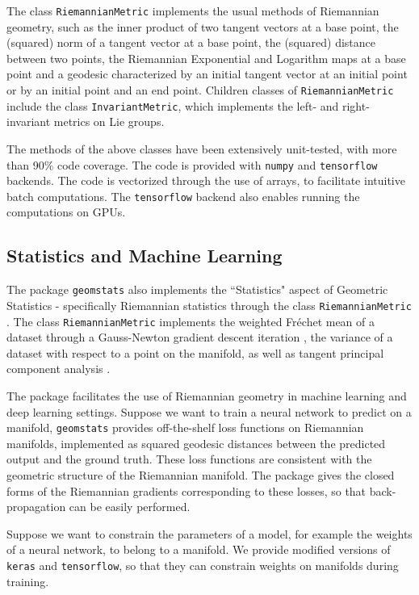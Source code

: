 \documentclass{article}
\begin{document}
The class \texttt{RiemannianMetric} implements the usual methods of Riemannian geometry, such as the inner product of two tangent vectors at a base point, the (squared) norm of a tangent vector at a base point, the (squared) distance between two points, the Riemannian Exponential and Logarithm maps at a base point and a geodesic characterized by an initial tangent vector at an initial point or by an initial point and an end point. Children classes of \texttt{RiemannianMetric} include the class \texttt{InvariantMetric}, which implements the left- and right- invariant metrics on Lie groups.

The methods of the above classes have been extensively unit-tested, with more than 90\% code coverage. The code is provided with \texttt{numpy} and \texttt{tensorflow} backends. The code is vectorized through the use of arrays, to facilitate intuitive batch computations. The \texttt{tensorflow} backend also enables running the computations on GPUs.

\subsection{Statistics and Machine Learning}

The package \texttt{geomstats} also implements the ``Statistics" aspect of Geometric Statistics - specifically Riemannian statistics through the class \texttt{RiemannianMetric} \cite{Pennec2006}. The class \texttt{RiemannianMetric} implements the weighted Fr\'echet mean of a dataset through a Gauss-Newton gradient descent iteration \cite{Frechet1948}, the variance of a dataset with respect to a point on the manifold, as well as tangent principal component analysis \cite{Fletcher2004}.

The package facilitates the use of Riemannian geometry in machine learning and deep learning settings. Suppose we want to train a neural network to predict on a manifold, \texttt{geomstats} provides off-the-shelf loss functions on Riemannian manifolds, implemented as squared geodesic distances between the predicted output and the ground truth. These loss functions are consistent with the geometric structure of the Riemannian manifold. The package gives the closed forms of the Riemannian gradients corresponding to these losses, so that back-propagation can be easily performed. 

Suppose we want to constrain the parameters of a model, for example the weights of a neural network, to belong to a manifold. We provide modified versions of \texttt{keras} and \texttt{tensorflow}, so that they can constrain weights on manifolds during training.
\end{document}
